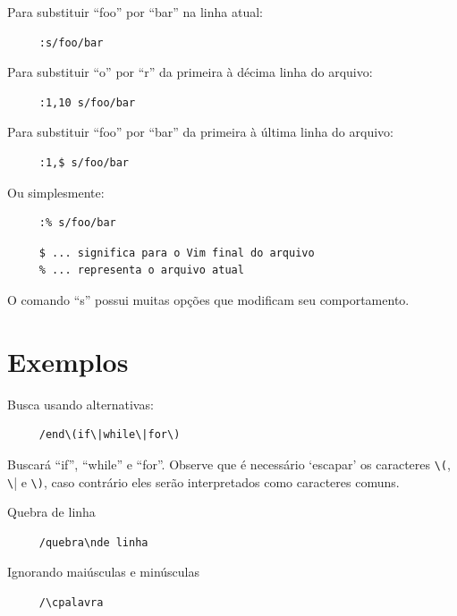 \documentclass[10pt,a4paper,openany]{book}
\begin{document}
Para substituir ``foo'' por ``bar'' na linha atual:

\begin{verbatim}
     :s/foo/bar
\end{verbatim}

Para substituir ``o'' por ``r'' da primeira à décima linha do arquivo:

\begin{verbatim}
     :1,10 s/foo/bar
\end{verbatim}

Para substituir ``foo'' por ``bar'' da primeira à última linha do arquivo:

\begin{verbatim}
     :1,$ s/foo/bar
\end{verbatim}

Ou simplesmente:

\begin{verbatim}
     :% s/foo/bar
\end{verbatim}

\begin{verbatim}
     $ ... significa para o Vim final do arquivo
     % ... representa o arquivo atual
\end{verbatim}

O comando ``s'' possui muitas opções que modificam seu comportamento.

\section{Exemplos }
\label{Exemplos }

Busca usando alternativas:

\begin{verbatim}
     /end\(if\|while\|for\)
\end{verbatim}

Buscará ``if'', ``while'' e ``for''.  Observe que é necessário `escapar' os
caracteres \verb|\(|, \verb|\|| e \verb|\)|, caso contrário eles serão
interpretados como caracteres comuns.

Quebra de linha

\begin{verbatim}
     /quebra\nde linha
\end{verbatim}

Ignorando maiúsculas e minúsculas

\begin{verbatim}
     /\cpalavra
\end{verbatim}
\end{document}
